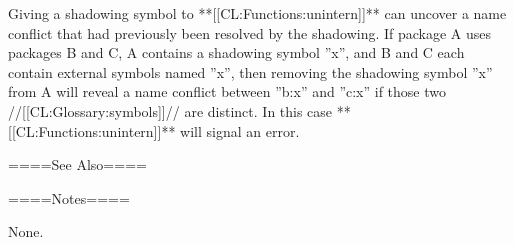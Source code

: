 Giving a shadowing symbol to **[[CL:Functions:unintern]]** can uncover a name conflict that had previously been resolved by the shadowing. If package A uses packages B and C, A contains a shadowing symbol ''x'', and B and C each contain external symbols named ''x'', then removing the shadowing symbol ''x'' from A will reveal a name conflict between ''b:x'' and ''c:x'' if those two //[[CL:Glossary:symbols]]// are distinct. In this case **[[CL:Functions:unintern]]** will signal an error.

====See Also====

{\secref\PackageConcepts}

====Notes====

None.

